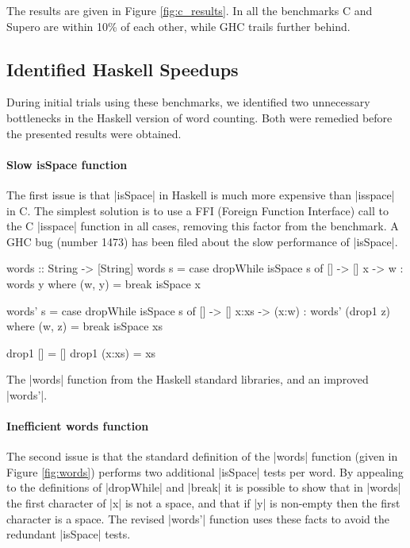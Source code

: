 The results are given in Figure \ref{fig:c_results}. In all the benchmarks C and Supero are within 10\% of each other, while GHC trails further behind.

\subsection{Identified Haskell Speedups}

During initial trials using these benchmarks, we identified two unnecessary bottlenecks in the Haskell version of word counting. Both were remedied before the presented results were obtained.

\paragraph{Slow \textsf{isSpace} function}

The first issue is that |isSpace| in Haskell is much more expensive than |isspace| in C. The simplest solution is to use a FFI (Foreign Function Interface) \cite{spj:awkward_squad} call to the C |isspace| function in all cases, removing this factor from the benchmark. A GHC bug (number 1473) has been filed about the slow performance of |isSpace|.

\begin{fig}
\begin{code}
words :: String -> [String]
words s = case  dropWhile isSpace s of
                []  ->  []
                x   ->  w : words y
                        where (w, y) = break isSpace x

words' s = case  dropWhile isSpace s of
                 []    ->  []
                 x:xs  ->  (x:w) : words' (drop1 z)
                           where (w, z) = break isSpace xs

drop1 []      = []
drop1 (x:xs)  = xs
\end{code}
\figend
\caption{The |words| function from the Haskell standard libraries, and an improved |words'|.}
\label{fig:words}
\end{fig}

\paragraph{Inefficient \textsf{words} function}

The second issue is that the standard definition of the |words| function (given in Figure \ref{fig:words}) performs two additional |isSpace| tests per word. By appealing to the definitions of |dropWhile| and |break| it is possible to show that in |words| the first character of |x| is not a space, and that if |y| is non-empty then the first character is a space. The revised |words'| function uses these facts to avoid the redundant |isSpace| tests.

